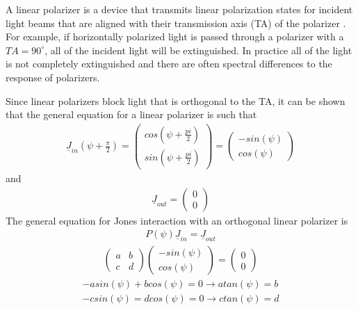 A linear polarizer is a device that transmits linear polarization states for incident light beams that are aligned with their transmission axis (TA) of the polarizer \cite{polarizedlight}.  For example, if horizontally polarized light is passed through a polarizer with a $TA = 90^{\circ}$, all of the incident light will be extinguished.  In practice all of the light is not completely extinguished and there are often spectral differences to the response of polarizers.

Since linear polarizers block light that is orthogonal to the TA, it can be shown that the general equation for a linear polarizer is such that
%
\begin{align}
    \underline{J}_{in}(\psi + \frac{\pi}{2}) =
    \begin{pmatrix}
        cos(\psi + \frac{pi}{2}) \\
        sin(\psi + \frac{pi}{2})
    \end{pmatrix}
    =
    \begin{pmatrix}
        -sin(\psi) \\
        cos(\psi)
    \end{pmatrix}
\end{align}
%
and
\begin{align}
    \underline{J}_{out} =
    \begin{pmatrix}
        0 \\
        0
    \end{pmatrix}
\end{align}
%
The general equation for Jones interaction with an orthogonal linear polarizer is
%
\begin{align}
    P(\psi)\underline{J}_{in} = \underline{J}_{out}
\end{align}
\begin{align}
    \begin{pmatrix}
        a & b \\
        c & d
    \end{pmatrix}
    \begin{pmatrix}
        -sin(\psi) \\
        cos(\psi)
    \end{pmatrix}
    =
    \begin{pmatrix}
        0 \\
        0
    \end{pmatrix}
\end{align}
\begin{align}
    -asin(\psi) + bcos(\psi) = 0 \rightarrow atan(\psi) = b \\
    -csin(\psi) = dcos(\psi) = 0 \rightarrow ctan(\psi) = d
\end{align}
